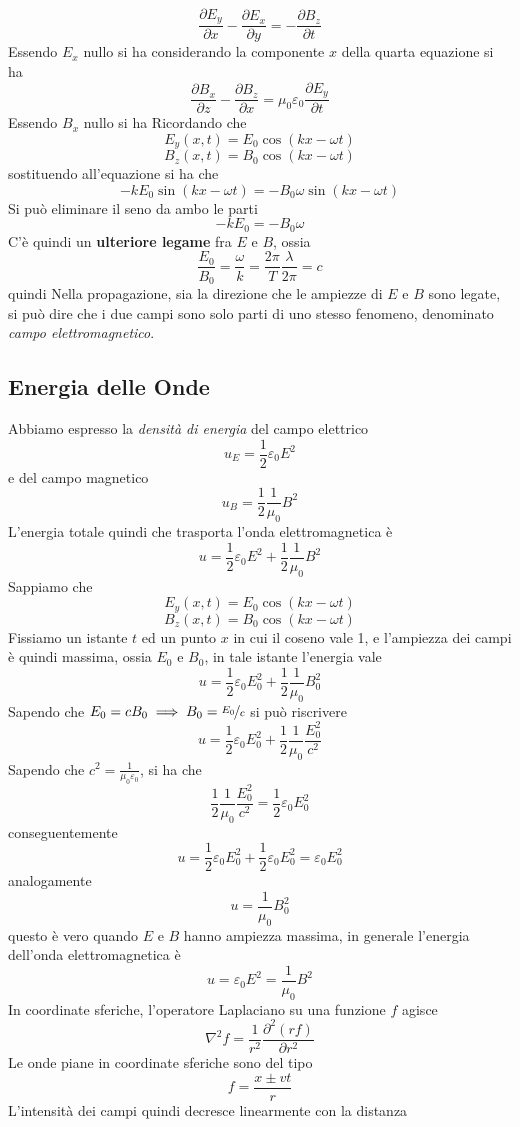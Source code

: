 \documentclass[10pt, letterpaper]{report}
\begin{document}
$$\frac{\partial E_y}{\partial x}-\frac{\partial E_x}{\partial y}=-\frac{\partial B_z}{\partial t}$$
Essendo $E_x$ nullo si ha 
considerando la componente $x$ della quarta equazione si ha 
$$ \frac{\partial B_x}{\partial z}- \frac{\partial B_z}{\partial x}=\mu_0\varepsilon_0\frac{\partial E_y}{\partial t}$$
Essendo $B_x$ nullo si ha 
Ricordando che 
$$ 
E_y(x,t)=E_0\cos(kx-\omega t)
$$
$$  B_z(x,t)=B_0\cos(kx-\omega t)
$$
sostituendo all'equazione si ha che 
$$ -kE_0\sin(kx-\omega t)=-B_0\omega \sin(kx-\omega t)$$
Si può eliminare il seno da ambo le parti
$$ -kE_0=-B_0\omega$$
C'è quindi un \textbf{ulteriore legame} fra $E$ e $B$, ossia 
$$ \frac{E_0}{B_0}=\frac{\omega}{k}=\frac{2\pi}{T}\frac{\lambda}{2\pi}=c$$
quindi 
Nella propagazione, sia la direzione che le ampiezze di $E$ e $B$ sono legate, si può dire che i due campi sono solo parti di uno stesso fenomeno, denominato \textit{campo elettromagnetico}.
\subsection{Energia delle Onde}
Abbiamo espresso la \textit{densità di energia} del campo elettrico 
$$ u_E=\frac{1}{2}\varepsilon_0 E^2$$
e del campo magnetico 
$$ u_B=\frac{1}{2}\frac{1}{\mu_0}B^2$$
L'energia totale quindi che trasporta l'onda elettromagnetica è 
$$u=\frac{1}{2}\varepsilon_0 E^2+\frac{1}{2}\frac{1}{\mu_0}B^2$$
Sappiamo che 
$$ 
E_y(x,t)=E_0\cos(kx-\omega t)
$$
$$  B_z(x,t)=B_0\cos(kx-\omega t)
$$
Fissiamo un istante $t$ ed un punto $x$ in cui il coseno vale 1, e l'ampiezza dei campi è quindi massima, ossia $E_0$ e $B_0$, in tale istante l'energia vale 
$$u=\frac{1}{2}\varepsilon_0 E_0^2+\frac{1}{2}\frac{1}{\mu_0}B_0^2$$
Sapendo che $E_0=cB_0\implies B_0=\nicefrac{E_0}{c}$ si può riscrivere 
$$u=\frac{1}{2}\varepsilon_0 E_0^2+\frac{1}{2}\frac{1}{\mu_0}\frac{E_0^2}{c^2}$$
Sapendo che $c^2=\frac{1}{\mu_0\varepsilon_0}$, si ha che 
$$\frac{1}{2}\frac{1}{\mu_0}\frac{E_0^2}{c^2}= \frac{1}{2}\varepsilon_0 E_0^2$$
conseguentemente 
$$ u=\frac{1}{2}\varepsilon_0 E_0^2+\frac{1}{2}\varepsilon_0 E_0^2=\varepsilon_0E_0^2$$
analogamente 
$$ u=\frac{1}{\mu_0}B_0^2$$
questo è vero quando $E$ e $B$ hanno ampiezza massima, in generale l'energia dell'onda elettromagnetica è$$ u=\varepsilon_0E^2=\frac{1}{\mu_0}B^2$$
In coordinate sferiche, l'operatore Laplaciano su una funzione $f$ agisce 
$$\nabla^2f=\frac{1}{r^2}\frac{\partial^2 (rf)}{\partial r^2} $$
Le onde piane in coordinate sferiche sono del tipo 
$$f=\frac{x\pm vt}{r} $$
L'intensità dei campi quindi decresce linearmente con la distanza 
\end{document}
